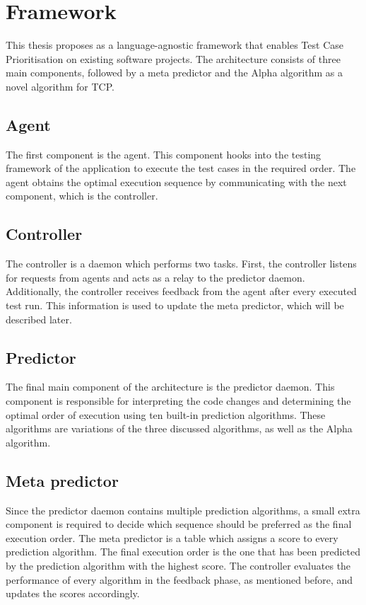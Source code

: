 \section{Framework}
\noindent This thesis proposes \velocity{} as a language-agnostic framework that enables Test Case Prioritisation on existing software projects. The architecture consists of three main components, followed by a meta predictor and the Alpha algorithm as a novel algorithm for TCP.

\subsection{Agent}
\noindent The first component is the agent. This component hooks into the testing framework of the application to execute the test cases in the required order. The agent obtains the optimal execution sequence by communicating with the next component, which is the controller.

\subsection{Controller}
\noindent The controller is a daemon which performs two tasks. First, the controller listens for requests from agents and acts as a relay to the predictor daemon. Additionally, the controller receives feedback from the agent after every executed test run. This information is used to update the meta predictor, which will be described later.

\subsection{Predictor}
\noindent The final main component of the architecture is the predictor daemon. This component is responsible for interpreting the code changes and determining the optimal order of execution using ten built-in prediction algorithms. These algorithms are variations of the three discussed algorithms, as well as the Alpha algorithm.

\subsection{Meta predictor}
\noindent Since the predictor daemon contains multiple prediction algorithms, a small extra component is required to decide which sequence should be preferred as the final execution order. The meta predictor is a table which assigns a score to every prediction algorithm. The final execution order is the one that has been predicted by the prediction algorithm with the highest score. The controller evaluates the performance of every algorithm in the feedback phase, as mentioned before, and updates the scores accordingly.

